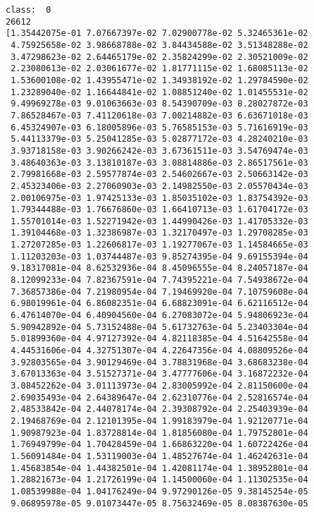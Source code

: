 \documentclass[11pt]{article}
\begin{document}
    \begin{Verbatim}[commandchars=\\\{\}]
class:  0
26612
[1.35442075e-01 7.07667397e-02 7.02900778e-02 5.32465361e-02
 4.75925658e-02 3.98668788e-02 3.84434588e-02 3.51348288e-02
 3.47298623e-02 2.64465179e-02 2.35824299e-02 2.30521009e-02
 2.23080613e-02 2.03061677e-02 1.81771115e-02 1.68085113e-02
 1.53600108e-02 1.43955471e-02 1.34938192e-02 1.29784590e-02
 1.23289040e-02 1.16644841e-02 1.08851240e-02 1.01455531e-02
 9.49969278e-03 9.01063663e-03 8.54390709e-03 8.28027872e-03
 7.86528467e-03 7.41120618e-03 7.00214882e-03 6.63671018e-03
 6.45324907e-03 6.18005896e-03 5.76585153e-03 5.71616919e-03
 5.44113379e-03 5.25041285e-03 5.02877172e-03 4.28240210e-03
 3.93718158e-03 3.90266242e-03 3.67361511e-03 3.54769474e-03
 3.48640363e-03 3.13810187e-03 3.08814886e-03 2.86517561e-03
 2.79981668e-03 2.59577874e-03 2.54602667e-03 2.50663142e-03
 2.45323406e-03 2.27060903e-03 2.14982550e-03 2.05570434e-03
 2.00106975e-03 1.97425133e-03 1.85035102e-03 1.83754392e-03
 1.79344488e-03 1.76676860e-03 1.66410713e-03 1.61704172e-03
 1.55701014e-03 1.52271942e-03 1.44990426e-03 1.41705332e-03
 1.39104468e-03 1.32386987e-03 1.32170497e-03 1.29708285e-03
 1.27207285e-03 1.22606817e-03 1.19277067e-03 1.14584665e-03
 1.11203203e-03 1.03744487e-03 9.85274395e-04 9.69155394e-04
 9.18317081e-04 8.62532936e-04 8.45096555e-04 8.24057187e-04
 8.12099233e-04 7.82367591e-04 7.74395221e-04 7.54938672e-04
 7.36857386e-04 7.21980954e-04 7.19469920e-04 7.10759608e-04
 6.98019961e-04 6.86082351e-04 6.68823091e-04 6.62116512e-04
 6.47614070e-04 6.40904560e-04 6.27083072e-04 5.94806923e-04
 5.90942892e-04 5.73152488e-04 5.61732763e-04 5.23403304e-04
 5.01899360e-04 4.97127392e-04 4.82118385e-04 4.51642558e-04
 4.44531606e-04 4.32751307e-04 4.22647356e-04 4.08809526e-04
 3.92803565e-04 3.90129469e-04 3.78831968e-04 3.68683238e-04
 3.67013363e-04 3.51527371e-04 3.47777606e-04 3.16872232e-04
 3.08452262e-04 3.01113973e-04 2.83005992e-04 2.81150600e-04
 2.69035493e-04 2.64389647e-04 2.62310776e-04 2.52816574e-04
 2.48533842e-04 2.44078174e-04 2.39308792e-04 2.25403939e-04
 2.19468769e-04 2.12101395e-04 1.99183979e-04 1.92120771e-04
 1.90987923e-04 1.83728814e-04 1.81856080e-04 1.79752801e-04
 1.76949799e-04 1.70428459e-04 1.66863220e-04 1.60722426e-04
 1.56091484e-04 1.53119003e-04 1.48527674e-04 1.46242631e-04
 1.45683854e-04 1.44382501e-04 1.42081174e-04 1.38952801e-04
 1.28821673e-04 1.21726199e-04 1.14500060e-04 1.11302535e-04
 1.08539988e-04 1.04176249e-04 9.97290126e-05 9.38145254e-05
 9.06895978e-05 9.01073447e-05 8.75632469e-05 8.08387630e-05

\end{Verbatim}
\end{document}
